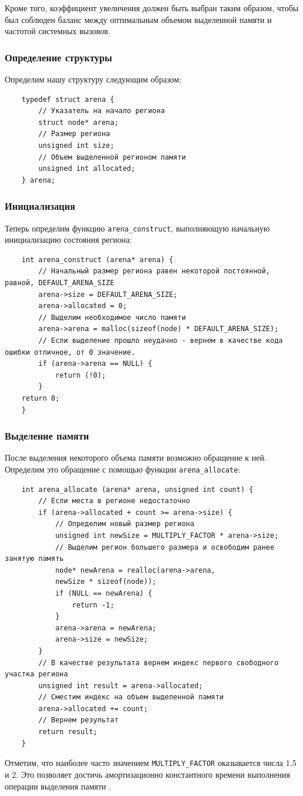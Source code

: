 \documentclass[coursework]{SCWorks}
\begin{document}
Кроме того, коэффициент увеличения должен быть выбран таким образом, чтобы был 
соблюден баланс между оптимальным объемом выделенной памяти и частотой системных
вызовов.

\subsubsection{Определение структуры}
Определим нашу структуру следующим образом:
\begin{verbatim}
    typedef struct arena {
        // Указатель на начало региона
        struct node* arena;
        // Размер региона
        unsigned int size;
        // Объем выделенной регионом памяти
        unsigned int allocated;
    } arena;
\end{verbatim}

\subsubsection{Инициализация}
Теперь определим функцию \verb|arena_construct|, выполняющую начальную 
инициализацию состояния региона:
\begin{verbatim}
    int arena_construct (arena* arena) {
        // Начальный размер региона равен некоторой постоянной, равной, DEFAULT_ARENA_SIZE
        arena->size = DEFAULT_ARENA_SIZE;
        arena->allocated = 0;
        // Выделим необходимое число памяти
        arena->arena = malloc(sizeof(node) * DEFAULT_ARENA_SIZE);
        // Если выделение прошло неудачно - вернем в качестве кода ошибки отличное, от 0 значение.
        if (arena->arena == NULL) {
            return (!0);
        }
    return 0;
    }
\end{verbatim}

\subsubsection{Выделение памяти}
После выделения некоторого объема памяти возможно обращение к ней.
Определим это обращение с помощью функции \verb|arena_allocate|:
\begin{verbatim}
    int arena_allocate (arena* arena, unsigned int count) {
        // Если места в регионе недостаточно
        if (arena->allocated + count >= arena->size) {
            // Определим новый размер региона
            unsigned int newSize = MULTIPLY_FACTOR * arena->size;
            // Выделим регион большего размера и освободим ранее занятую память
            node* newArena = realloc(arena->arena,
            newSize * sizeof(node));
            if (NULL == newArena) {
                return -1;
            }
            arena->arena = newArena;
            arena->size = newSize;
        }
        // В качестве результата вернем индекс первого свободного участка региона
        unsigned int result = arena->allocated;
        // Сместим индекс на объем выделенной памяти
        arena->allocated += count;
        // Вернем результат
        return result;
    }
\end{verbatim}
Отметим, что наиболее часто значением \verb|MULTIPLY_FACTOR| оказывается числа
1.5 и 2. Это позволяет достичь амортизационно константного времени выполнения 
операции выделения памяти \cite{Fbdoc}.
\end{document}
